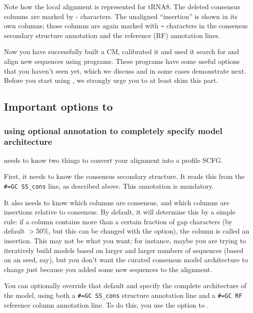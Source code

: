 Note how the local alignment is represented for tRNA8. The deleted
consensus columns are marked by - characters. The unaligned
``insertion'' is shown in its own columns; those columns are again
marked with \verb+~+ characters in the consensus secondary structure
annotation and the reference (RF) annotation lines.

Now you have successfully built a CM, calibrated it and used it search
for and align new sequences using  programs.
These programs have some useful options that you haven't seen
yet, which we discuss and in some cases demonstrate next. Before you
start using , we strongly urge you to at
least skim this part. 

\subsection{Important options to }

\subsubsection{using optional annotation to completely specify model architecture}

 needs to know two things to convert your alignment into
a profile SCFG.

First, it needs to know the consensus secondary structure. It reads
this from the {\small\verb+#=GC SS_cons+} line, as described
above. This annotation is mandatory.

It also needs to know which columns are consensus, and which columns
are insertions relative to consensus. By default, it will determine
this by a simple rule: if a column contains more than a certain
fraction of gap characters (by default $>$50\%, but this can be changed
with the  option), the column is called an
insertion. This may not be what you want; for instance, maybe you are
trying to iteratively build models based on larger and larger numbers
of sequences (based on an  seed, say), but you don't
want the curated consensus model architecture to change just because
you added some new sequences to the alignment.

You can optionally override that default and specify the complete
architecture of the model, using both a {\small\verb+#=GC SS_cons+}
structure annotation line and a {\small\verb+#=GC RF+} reference
column annotation line.  To do this, you use the  option to
.


